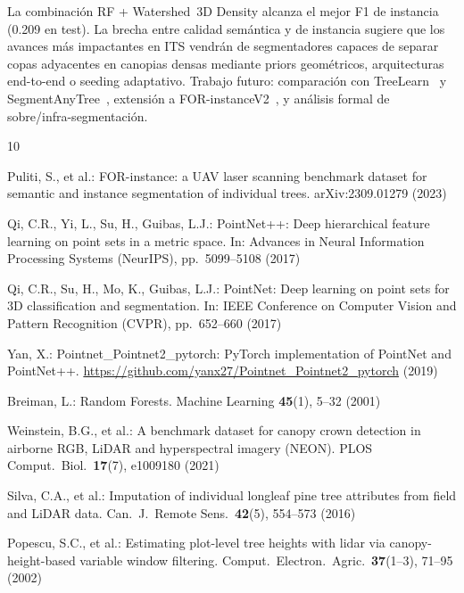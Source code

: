 \documentclass[runningheads]{llncs}
\begin{document}
La combinación RF + Watershed~3D Density alcanza el mejor F1 de instancia (0.209 en test). La brecha entre calidad semántica y de instancia sugiere que los avances más impactantes en ITS vendrán de segmentadores capaces de separar copas adyacentes en canopias densas mediante priors geométricos, arquitecturas end-to-end o seeding adaptativo. Trabajo futuro: comparación con TreeLearn~\cite{henrich2024} y SegmentAnyTree~\cite{wielgosz2024}, extensión a FOR-instanceV2~\cite{xiang2025}, y análisis formal de sobre/infra-segmentación.
\begin{thebibliography}{10}

Puliti, S., et al.:
FOR-instance: a UAV laser scanning benchmark dataset for semantic and instance segmentation of individual trees.
arXiv:2309.01279 (2023)

Qi, C.R., Yi, L., Su, H., Guibas, L.J.:
PointNet++: Deep hierarchical feature learning on point sets in a metric space.
In: Advances in Neural Information Processing Systems (NeurIPS), pp.~5099--5108 (2017)

Qi, C.R., Su, H., Mo, K., Guibas, L.J.:
PointNet: Deep learning on point sets for 3D classification and segmentation.
In: IEEE Conference on Computer Vision and Pattern Recognition (CVPR), pp.~652--660 (2017)

Yan, X.:
Pointnet\_Pointnet2\_pytorch: PyTorch implementation of PointNet and PointNet++.
\url{https://github.com/yanx27/Pointnet_Pointnet2_pytorch} (2019)

Breiman, L.:
Random Forests.
Machine Learning \textbf{45}(1), 5--32 (2001)

Weinstein, B.G., et al.:
A benchmark dataset for canopy crown detection in airborne RGB, LiDAR and hyperspectral imagery (NEON).
PLOS Comput.\ Biol.\ \textbf{17}(7), e1009180 (2021)

Silva, C.A., et al.:
Imputation of individual longleaf pine tree attributes from field and LiDAR data.
Can.\ J.\ Remote Sens.\ \textbf{42}(5), 554--573 (2016)

Popescu, S.C., et al.:
Estimating plot-level tree heights with lidar via canopy-height-based variable window filtering.
Comput.\ Electron.\ Agric.\ \textbf{37}(1--3), 71--95 (2002)


\end{thebibliography}
\end{document}
